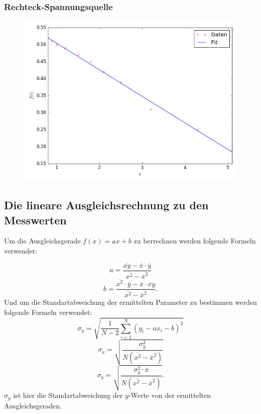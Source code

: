 \newpage
\subsubsection{Rechteck-Spannungsquelle}

\begin{figure}[H]
	\centering
	\caption{}
	\includegraphics[width=\linewidth-150pt,height=\textheight-150pt,keepaspectratio]{Rechteck.png}
	\label{fig:Rechteck}
\end{figure}


\newpage
\subsection{Die lineare Ausgleichsrechnung zu den Messwerten}
Um die Ausgleichsgerade $f(x)=ax+b$ zu berrechnen werden folgende Formeln verwendet:

\begin{equation}
a=\frac{ \overline{xy} - \overline{x} \cdot \overline{y}}{\overline{x^2} - \overline{x}^2}
\end{equation}
\begin{equation}
b=\frac{\overline{x^2} \cdot \overline{y} - \overline{x} \cdot \overline{xy}}{\overline{x^2} - \overline{x}^2}\text{.}
\end{equation}
Und um die Standartabweichung der ermittelten Parameter zu bestimmen werden folgende Formeln verwendet:
\begin{equation}
\sigma_y=\sqrt{\frac{1}{N-2}\sum\limits_{i=1}^{N}(y_i - a x_i - b)^2}
\end{equation}
\begin{equation}
\sigma_a=\sqrt{\frac{\sigma_y^2}{N ( \overline{x^2} - \overline{x} ^2 )}}
\end{equation}
\begin{equation}
\sigma_b=\sqrt{\frac{\sigma_y^2 \cdot \overline{x}}{N ( \overline{x^2} - \overline{x} ^2 )}}\text{.}
\end{equation}
$\sigma_y$ ist hier die Standartabweichung der $y$-Werte von der ermittelten Ausgleichsgeraden.


